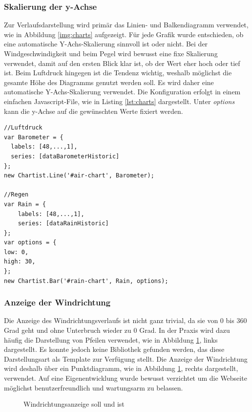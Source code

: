 \subsubsection{Skalierung der y-Achse}
Zur Verlaufsdarstellung wird primär das Linien- und Balkendiagramm verwendet, wie in Abbildung \ref{img:charts} aufgezeigt. Für jede Grafik wurde entschieden, ob eine automatische Y-Achs-Skalierung sinnvoll ist oder nicht. Bei der Windgeschwindigkeit und beim Pegel wird bewusst eine fixe Skalierung verwendet, damit auf den ersten Blick klar ist, ob der Wert eher hoch oder tief ist. Beim Luftdruck hingegen ist die Tendenz wichtig, weshalb möglichst die gesamte Höhe des Diagramms genutzt werden soll. Es wird daher eine automatische Y-Achs-Skalierung verwendet. Die Konfiguration erfolgt in einem einfachen Javascript-File, wie in Listing \ref{lst:charts}  dargestellt. Unter \textit{options} kann die y-Achse auf die gewünschten Werte fixiert werden.\newline

\begin{lstlisting}[label=lst:charts,caption=Konfiguration der Verlaufsdiagramme, language=HTML5, style=htmlcssjs]
//Luftdruck
var Barometer = {
  labels: [48,...,1],
  series: [dataBarometerHistoric]
};
new Chartist.Line('#air-chart', Barometer);

//Regen
var Rain = {
	labels: [48,...,1],
	series: [dataRainHistoric]
};
var options = {
low: 0,
high: 30,
};
new Chartist.Bar('#rain-chart', Rain, options);
\end{lstlisting}



\subsubsection{Anzeige der Windrichtung}
Die Anzeige des Windrichtungsverlaufs ist nicht ganz trivial, da sie von 0 bis 360 Grad geht und ohne Unterbruch wieder zu 0 Grad. In der Praxis wird dazu häufig die Darstellung von Pfeilen verwendet, wie in Abbildung \ref{img:windrichtung}, links dargestellt. Es konnte jedoch keine Bibliothek gefunden werden, das diese Darstellungsart als Template zur Verfügung stellt. Die Anzeige der Windrichtung wird deshalb über ein Punktdiagramm, wie in Abbildung \ref{img:windrichtung}, rechts dargestellt, verwendet. Auf eine Eigenentwicklung wurde bewusst verzichtet um die Webseite möglichst benutzerfreundlich und wartungsarm zu belassen.

\begin{figure}[htbp!]
	\centering
	\caption{Windrichtungsanzeige soll und ist}
	\label{img:windrichtung}
\end{figure}

